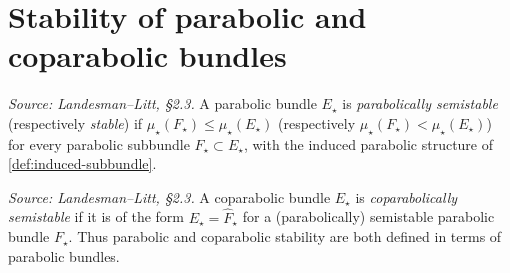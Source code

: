 \section{Stability of parabolic and coparabolic bundles}
\label{sec:stability-parabolic}

\begin{definition}
  \label{def:parabolic-stability}
  \textit{Source: Landesman--Litt, \S2.3.}
  A parabolic bundle $E_\star$ is \emph{parabolically semistable}
  (respectively \emph{stable}) if $\mu_\star(F_\star) \leq \mu_\star(E_\star)$
  (respectively $\mu_\star(F_\star) < \mu_\star(E_\star)$) for every parabolic
  subbundle $F_\star \subset E_\star$, with the induced parabolic structure of
  \cref{def:induced-subbundle}.
\end{definition}

\begin{definition}
  \label{def:coparabolic-stability}
  \textit{Source: Landesman--Litt, \S2.3.}
  A coparabolic bundle $E_\star$ is \emph{coparabolically semistable} if it is of
  the form $E_\star = \widehat{F}_\star$ for a (parabolically) semistable
  parabolic bundle $F_\star$. Thus parabolic and coparabolic stability are both
  defined in terms of parabolic bundles.
\end{definition}

